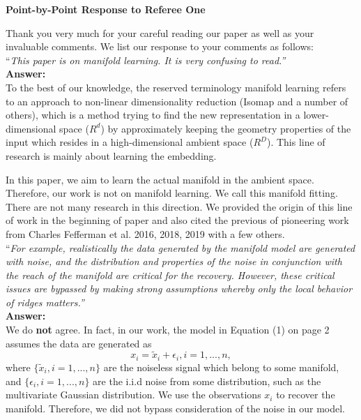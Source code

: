 \documentclass[12pt]{article}
\begin{document}

\begin{center}
{\bf \large Point-by-Point Response to Referee One}
\end{center}
Thank you very much for your careful reading our paper as well as your invaluable comments. We list our response to your comments as follows:\\ 

\noindent ``\textit {This paper is on manifold learning.  It is very confusing to read.''}\\

{\bf Answer:}\\

To the best of our knowledge, the reserved terminology manifold learning refers to an approach to non-linear dimensionality reduction (Isomap and a number of others), which is a method trying to find the new representation in a lower-dimensional space ($R^d$) by approximately keeping the geometry properties of the input which resides in a high-dimensional ambient space ($R^D$). This line of research is mainly about learning the embedding. 

In this paper, we aim to learn the actual manifold in the ambient space. Therefore, our work is not on manifold learning. We call this manifold fitting. There are not many research in this direction. We provided the origin of this line of work in the beginning of paper and also cited the previous of pioneering work from Charles Fefferman et al. 2016, 2018, 2019 with a few others. \\ 




\noindent ``\textit{For example, realistically the data generated by the manifold model are generated with noise, and the distribution and properties of the noise in conjunction with the reach of the manifold are critical for the recovery. However, these critical issues are bypassed by making strong assumptions whereby only the local behavior of ridges matters.''}\\

{\bf Answer:}\\
We do {\bf not} agree. In fact, in our work, the model in Equation (1) on page 2 assumes the data are generated as 
\begin{equation}\label{model}
x_i=\tilde{x}_i+\epsilon_i, i=1,...,n,
\end{equation}
where $\{\tilde{x}_i, i=1,...,n\}$ are the noiseless signal which belong to some manifold, and $\{\epsilon_i, i=1,...,n\}$ are the i.i.d noise from some distribution, such as the multivariate Gaussian distribution.  We use the observations $x_i$ to recover the manifold. Therefore, we did not bypass consideration of the noise in our model.\\
\end{document}
